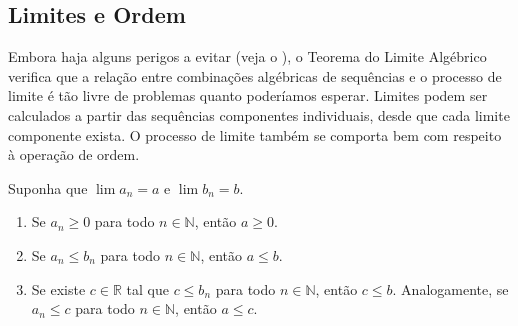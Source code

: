 \subsection{Limites e Ordem}

Embora haja alguns perigos a evitar (veja o ), o Teorema do Limite Algébrico verifica que a relação entre combinações algébricas de sequências e o processo de limite é tão livre de problemas quanto poderíamos esperar. Limites podem ser calculados a partir das sequências componentes individuais, desde que cada limite componente exista. O processo de limite também se comporta bem com respeito à operação de ordem.


\begin{theorem}\label{thm:limite-ordem}
Suponha que $\lim a_n = a$ e $\lim b_n = b$.
\begin{enumerate}[label=(\roman*)]
\item Se $a_n \geq 0$ para todo $n \in \mathbb{N}$, então $a \geq 0$.
\item Se $a_n \leq b_n$ para todo $n \in \mathbb{N}$, então $a \leq b$.
\item Se existe $c \in \mathbb{R}$ tal que $c \leq b_n$ para todo $n \in \mathbb{N}$, então $c \leq b$. Analogamente, se $a_n \leq c$ para todo $n \in \mathbb{N}$, então $a \leq c$.
\end{enumerate}
\end{theorem}

